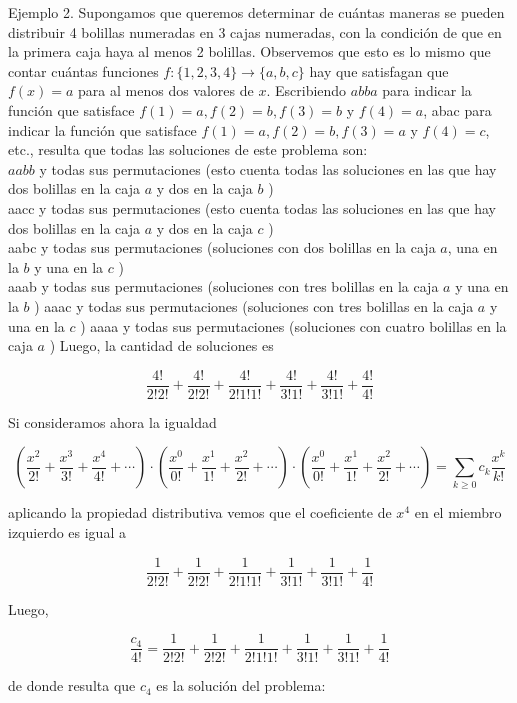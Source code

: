 \documentclass[10pt]{article}
\begin{document}
Ejemplo 2. Supongamos que queremos determinar de cuántas maneras se pueden distribuir 4 bolillas numeradas en 3 cajas numeradas, con la condición de que en la primera caja haya al menos 2 bolillas. Observemos que esto es lo mismo que contar cuántas funciones $f:\{1,2,3,4\} \longrightarrow\{a, b, c\}$ hay que satisfagan que $f(x)=a$ para al menos dos valores de $x$. Escribiendo $a b b a$ para indicar la función que satisface $f(1)=a, f(2)=b, f(3)=b$ y $f(4)=a$, abac para indicar la función que satisface $f(1)=a, f(2)=b, f(3)=a$ y $f(4)=c$, etc., resulta que todas las soluciones de este problema son:\\
$a a b b$ y todas sus permutaciones (esto cuenta todas las soluciones en las que hay dos bolillas en la caja $a$ y dos en la caja $b$ )\\
aacc y todas sus permutaciones (esto cuenta todas las soluciones en las que hay dos bolillas en la caja $a$ y dos en la caja $c$ )\\
aabc y todas sus permutaciones (soluciones con dos bolillas en la caja $a$, una en la $b$ y una en la $c$ )\\
aaab y todas sus permutaciones (soluciones con tres bolillas en la caja $a$ y una en la $b$ ) aaac y todas sus permutaciones (soluciones con tres bolillas en la caja $a$ y una en la $c$ ) aaaa y todas sus permutaciones (soluciones con cuatro bolillas en la caja $a$ ) Luego, la cantidad de soluciones es

$$
\frac{4!}{2!2!}+\frac{4!}{2!2!}+\frac{4!}{2!1!1!}+\frac{4!}{3!1!}+\frac{4!}{3!1!}+\frac{4!}{4!}
$$

Si consideramos ahora la igualdad

$$
\left(\frac{x^{2}}{2!}+\frac{x^{3}}{3!}+\frac{x^{4}}{4!}+\cdots\right) \cdot\left(\frac{x^{0}}{0!}+\frac{x^{1}}{1!}+\frac{x^{2}}{2!}+\cdots\right) \cdot\left(\frac{x^{0}}{0!}+\frac{x^{1}}{1!}+\frac{x^{2}}{2!}+\cdots\right)=\sum_{k \geq 0} c_{k} \frac{x^{k}}{k!}
$$

aplicando la propiedad distributiva vemos que el coeficiente de $x^{4}$ en el miembro izquierdo es igual a

$$
\frac{1}{2!2!}+\frac{1}{2!2!}+\frac{1}{2!1!1!}+\frac{1}{3!1!}+\frac{1}{3!1!}+\frac{1}{4!}
$$

Luego,

$$
\frac{c_{4}}{4!}=\frac{1}{2!2!}+\frac{1}{2!2!}+\frac{1}{2!1!1!}+\frac{1}{3!1!}+\frac{1}{3!1!}+\frac{1}{4!}
$$

de donde resulta que $c_{4}$ es la solución del problema:
\end{document}
